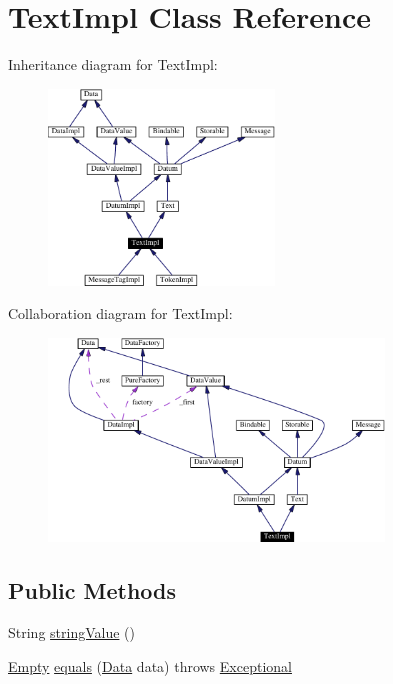 \hypertarget{classTextImpl}{
\section{Text\-Impl  Class Reference}
\label{classTextImpl}
}
Inheritance diagram for Text\-Impl:\begin{figure}[H]
\begin{center}
\leavevmode
\includegraphics[width=170pt]{classTextImpl__inherit__graph}
\end{center}
\end{figure}
Collaboration diagram for Text\-Impl:\begin{figure}[H]
\begin{center}
\leavevmode
\includegraphics[width=253pt]{classTextImpl__coll__graph}
\end{center}
\end{figure}
\subsection*{Public Methods}
\begin{CompactItemize}
\item 
String \hyperlink{classTextImpl_a0}{string\-Value} ()
\item 
\hyperlink{interfaceEmpty}{Empty} \hyperlink{classTextImpl_a1}{equals} (\hyperlink{interfaceData}{Data} data) throws \hyperlink{classExceptional}{Exceptional}
\end{CompactItemize}
